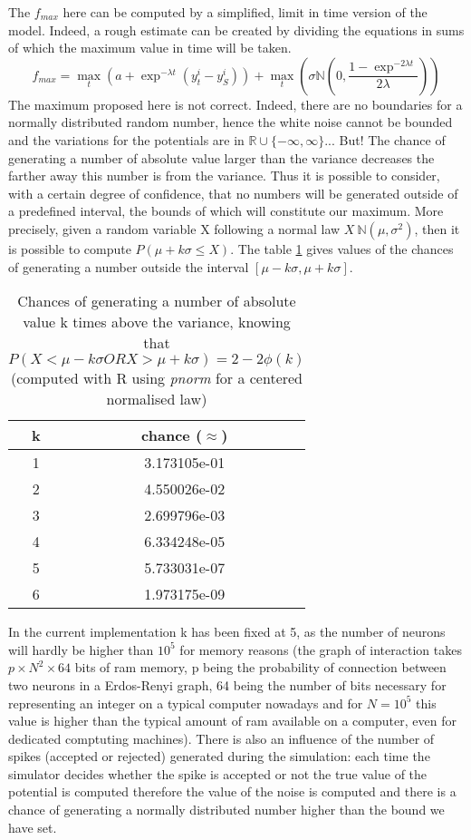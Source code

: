 	The $f_{max}$ here can be computed by a simplified, limit in time version of the model. Indeed, a rough estimate can be created by dividing the equations in sums of which the maximum value in time will be taken.
	\[
		f_{max}=\max_t(a+\exp^{-\lambda t}(y_t^i-y_S^i))+\max_t(\sigma\mathbb{N}(0,\frac{1-\exp^{-2\lambda t}}{2\lambda}))
	\]
	The maximum proposed here is not correct. Indeed, there are no boundaries for a normally distributed random number, hence the white noise cannot be bounded and the variations for the potentials are in $\mathbb{R}\cup\{-\infty,\infty\}$... But! The chance of generating a number of absolute value larger than the variance decreases the farther away this number is from the variance. Thus it is possible to consider, with a certain degree of confidence, that no numbers will be generated outside of a predefined interval, the bounds of which will constitute our maximum. More precisely, given a random variable X following a normal law $X~\mathbb{N}(\mu,\sigma^2)$, then it is possible to compute $P(\mu+k\sigma\leq X)$. The table \hyperref[repartitionFunction]{\ref{tab:repartitionFunction}} gives values of the chances of generating a number outside the interval $[\mu-k\sigma,\mu+k\sigma]$.\\
	\begin{table}
		\centering
		\begin{tabular}{cc}
			\textbf{k} & \textbf{chance} ($\approx$)\\\hline
			1 & 3.173105e-01\\
			2 & 4.550026e-02\\
			3 & 2.699796e-03\\
			4 & 6.334248e-05\\
			5 & 5.733031e-07\\
			6 & 1.973175e-09
		\end{tabular}
		\caption{Chances of generating a number of absolute value k times above the variance, knowing that $P(X < \mu-k\sigma OR X > \mu+k\sigma)=2-2\phi(k)$ (computed with R using \emph{pnorm} for a centered normalised law)}
		\label{tab:repartitionFunction}
	\end{table}
	In the current implementation k has been fixed at 5, as the number of neurons will hardly be higher than $10^5$ for memory reasons (the graph of interaction takes $p\times N^2\times 64$ bits of ram memory, p being the probability of connection between two neurons in a Erdos-Renyi graph, 64 being the number of bits necessary for representing an integer on a typical computer nowadays and for $N=10^5$ this value is higher than the typical amount of ram available on a computer, even for dedicated comptuting machines). There is also an influence of the number of spikes (accepted or rejected) generated during the simulation: each time the simulator decides whether the spike is accepted or not the true value of the potential is computed therefore the value of the noise is computed and there is a chance of generating a normally distributed number higher than the bound we have set.\\

